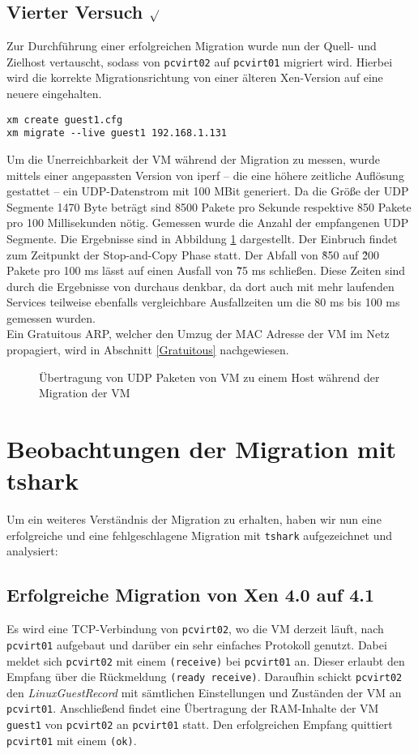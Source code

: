 \subsection {Vierter Versuch $\surd$ }
Zur Durchführung einer erfolgreichen Migration wurde nun der Quell- und Zielhost vertauscht, sodass von \verb#pcvirt02# auf \verb#pcvirt01# migriert wird. Hierbei wird die korrekte Migrationsrichtung von einer älteren Xen-Version auf eine neuere eingehalten.
\setupVerbatimOut
\begin{verbatim} 
xm create guest1.cfg
xm migrate --live guest1 192.168.1.131
\end{verbatim}

Um die Unerreichbarkeit der VM während der Migration zu messen, wurde mittels einer angepassten Version von iperf -- die eine höhere zeitliche Auflösung gestattet -- ein UDP-Datenstrom mit 100 MBit generiert. Da die Größe der UDP Segmente 1470 Byte beträgt sind 8500 Pakete pro Sekunde respektive 850 Pakete pro 100 Millisekunden nötig. Gemessen wurde die Anzahl der empfangenen UDP Segmente. Die Ergebnisse sind in Abbildung \ref{migration_plot} dargestellt. Der Einbruch findet zum Zeitpunkt der Stop-and-Copy Phase statt. Der Abfall von \~850 auf \~200 Pakete pro 100 ms lässt auf einen Ausfall von \~75 ms schließen. Diese Zeiten sind durch die Ergebnisse von \cite{clark2005live} durchaus denkbar, da dort auch mit mehr laufenden Services teilweise ebenfalls vergleichbare Ausfallzeiten um die 80 ms bis 100 ms gemessen wurden.
\\
Ein Gratuitous ARP, welcher den Umzug der MAC Adresse der VM im Netz propagiert, wird in Abschnitt \ref{Gratuitous} nachgewiesen.

\begin{figure}

\caption{Übertragung von UDP Paketen von VM zu einem Host während der Migration der VM}
\label{migration_plot}
\end{figure}

\section{Beobachtungen der Migration mit tshark} \label{mig_tcpdump}
Um ein weiteres Verständnis der Migration zu erhalten, haben wir nun eine erfolgreiche und eine fehlgeschlagene Migration mit \verb#tshark# aufgezeichnet und analysiert:

\subsection{Erfolgreiche Migration von Xen 4.0 auf 4.1}
Es wird eine TCP-Verbindung von \verb#pcvirt02#, wo die VM derzeit läuft, nach \verb#pcvirt01# aufgebaut und darüber ein sehr einfaches Protokoll genutzt. Dabei meldet sich \verb#pcvirt02# mit einem \verb|(receive)| bei \verb#pcvirt01# an. Dieser erlaubt den Empfang über die Rückmeldung \verb|(ready receive)|. 
Daraufhin schickt \verb#pcvirt02# den \emph{LinuxGuestRecord} mit sämtlichen Einstellungen und Zuständen der VM an \verb#pcvirt01#. Anschließend findet eine Übertragung der RAM-Inhalte der VM \verb#guest1# von \verb#pcvirt02#  an \verb#pcvirt01# statt. Den erfolgreichen Empfang quittiert \verb#pcvirt01# mit einem \verb|(ok)|.

